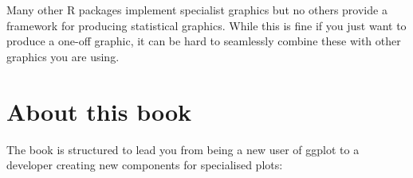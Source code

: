 Many other R packages implement specialist graphics but no others provide a framework for producing statistical graphics. While this is fine if you just want to produce a one-off graphic, it can be hard to seamlessly combine these with other graphics you are using.

\section{About this book}\label{sec:about_this_book}


The book is structured to lead you from being a new user of ggplot to a developer creating new components for specialised plots:

